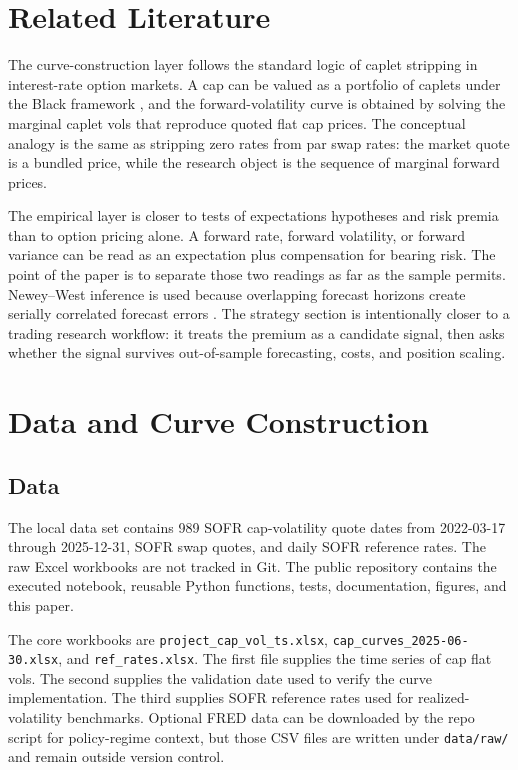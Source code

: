 \documentclass[12pt]{article}
\begin{document}
\section{Related Literature}

The curve-construction layer follows the standard logic of caplet stripping in interest-rate option
markets. A cap can be valued as a portfolio of caplets under the Black framework
\cite{black1976}, and the forward-volatility curve is obtained by solving the marginal caplet vols
that reproduce quoted flat cap prices. The conceptual analogy is the same as stripping zero rates
from par swap rates: the market quote is a bundled price, while the research object is the sequence
of marginal forward prices.

The empirical layer is closer to tests of expectations hypotheses and risk premia than to option
pricing alone. A forward rate, forward volatility, or forward variance can be read as an expectation
plus compensation for bearing risk. The point of the paper is to separate those two readings as far
as the sample permits. Newey--West inference is used because overlapping forecast horizons create
serially correlated forecast errors \cite{neweywest1987}. The strategy section is intentionally closer
to a trading research workflow: it treats the premium as a candidate signal, then asks whether the
signal survives out-of-sample forecasting, costs, and position scaling.

\section{Data and Curve Construction}

\subsection{Data}

The local data set contains 989 SOFR cap-volatility quote dates from 2022-03-17 through
2025-12-31, SOFR swap quotes, and daily SOFR reference rates. The raw Excel workbooks are
not tracked in Git. The public repository contains the executed notebook, reusable Python
functions, tests, documentation, figures, and this paper.

The core workbooks are \texttt{project\_cap\_vol\_ts.xlsx},
\texttt{cap\_curves\_2025-06-30.xlsx}, and \texttt{ref\_rates.xlsx}. The first file supplies the time
series of cap flat vols. The second supplies the validation date used to verify the curve
implementation. The third supplies SOFR reference rates used for realized-volatility benchmarks.
Optional FRED data can be downloaded by the repo script for policy-regime context, but those
CSV files are written under \texttt{data/raw/} and remain outside version control.
\end{document}

